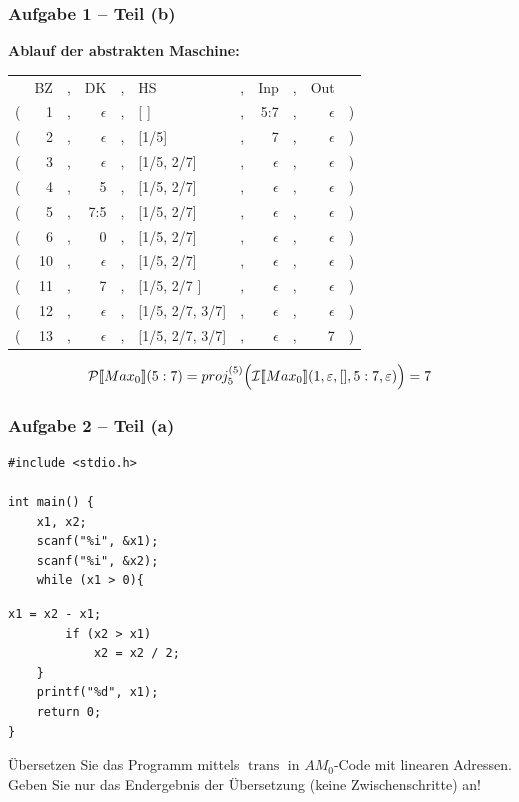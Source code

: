 \documentclass{beamer}
\renewcommand{\emph}[1]{\textbf{#1}}
\DeclareMathOperator{\trans}{trans}
\begin{document}
\begin{frame} \frametitle{Aufgabe 1 -- Teil (b)}
	\small
	\emph{Ablauf der abstrakten Maschine:} 
	\begin{center}
		\begin{tabular}{rrcrclcrcrl}
			& BZ &,& DK &,& HS &,& Inp &,& Out & \\
			( & 1 &,& $\epsilon$ &,& [ ] &,& 5:7 &,& $\epsilon$ & ) \\
			( & 2 &,& $\epsilon$ &,& [1/5] &,& 7 &,& $\epsilon$ & ) \\
			( & 3 &,& $\epsilon$ &,& [1/5, 2/7] &,& $\epsilon$ &,& $\epsilon$ & ) \\
			( & 4 &,& 5 &,& [1/5, 2/7] &,& $\epsilon$ &,& $\epsilon$ & ) \\
			( & 5 &,& 7:5 &,& [1/5, 2/7] &,& $\epsilon$ &,& $\epsilon$ & ) \\
			( & 6 &,& 0 &,& [1/5, 2/7] &,& $\epsilon$ &,& $\epsilon$ & ) \\
			( & 10 &,& $\epsilon$ &,& [1/5, 2/7] &,& $\epsilon$ &,& $\epsilon$ & ) \\
			( & 11 &,& 7 &,& [1/5, 2/7 ] &,& $\epsilon$ &,& $\epsilon$ & ) \\
			( & 12 &,& $\epsilon$ &,& [1/5, 2/7, 3/7] &,& $\epsilon$ &,& $\epsilon$ & ) \\
			( & 13 &,& $\epsilon$ &,& [1/5, 2/7, 3/7] &,& $\epsilon$ &,& 7 & ) \\
		\end{tabular}
	\end{center}
	
	\pause   		
	
	\begin{equation*}
	\mathcal{P} [\![ Max_0 ]\!] (5:7) = proj_5^{(5)} \Bigl( \mathcal{I}[\![ Max_0 ]\!] (1,\epsilon, [],5:7,\epsilon) \Bigr) = 7
	\end{equation*}
\end{frame}
%

\begin{frame}[fragile] \frametitle{Aufgabe 2 -- Teil (a)}
	\begin{minipage}{\dimexpr0.5\linewidth-\fboxrule-\fboxsep}
		\begin{lstlisting}
#include <stdio.h> 

int main() { 
	x1, x2;
	scanf("%i", &x1); 
	scanf("%i", &x2); 
	while (x1 > 0){
		\end{lstlisting}
	\end{minipage}
	\begin{minipage}{\dimexpr0.5\linewidth-\fboxrule-\fboxsep}
		\begin{lstlisting}[firstnumber=8]
		x1 = x2 - x1; 
		if (x2 > x1)
			x2 = x2 / 2;
	}
	printf("%d", x1); 
	return 0;
}
		\end{lstlisting}
	\end{minipage}

	\bigskip
	
	Übersetzen Sie das Programm mittels $\trans$ in $AM_0$-Code mit linearen Adressen. Geben Sie nur das Endergebnis der Übersetzung (keine Zwischenschritte) an!
\end{frame}
\end{document}
